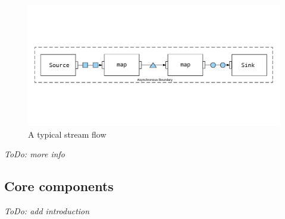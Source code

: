 \begin{figure}
\centering\includegraphics[width=.7\textwidth]{img/akka-streams-1}
\caption{A typical stream flow}\label{img:streams-1}
\end{figure}


\textit{ToDo: more info}

\subsection{Core components}

\textit{ToDo: add introduction}

